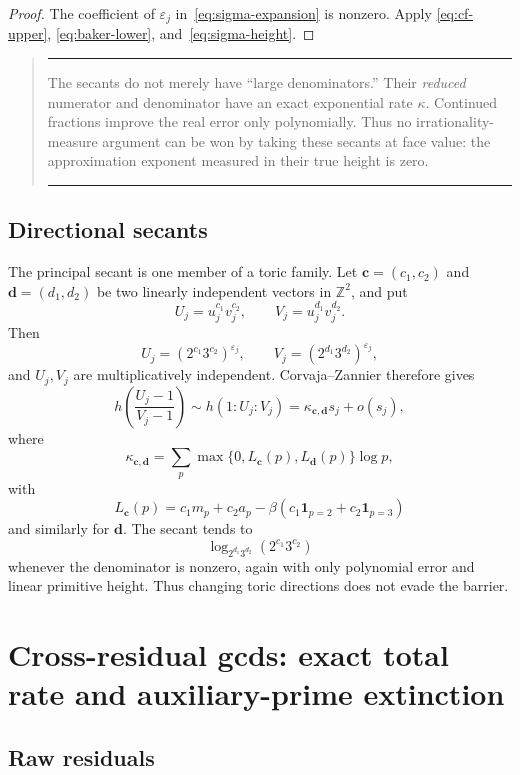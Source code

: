\documentclass[11pt,oneside]{article}
\theoremstyle{definition}
\theoremstyle{remark}
\newcommand{\Z}{\mathbb Z}
\newcommand{\eps}{\varepsilon}
\newenvironment{resultbox}
 {\begin{quote}\hrule\smallskip\noindent}
 {\par\smallskip\hrule\end{quote}}
\begin{document}
\begin{proof}
The coefficient of $\eps_j$ in~\eqref{eq:sigma-expansion} is nonzero.  Apply
\eqref{eq:cf-upper}, \eqref{eq:baker-lower}, and~\eqref{eq:sigma-height}.
\end{proof}

\begin{resultbox}
The secants do not merely have ``large denominators.''  Their \emph{reduced} numerator and
denominator have an exact exponential rate $\kappa$.  Continued fractions improve the real
error only polynomially.  Thus no irrationality-measure argument can be won by taking these
secants at face value: the approximation exponent measured in their true height is zero.
\end{resultbox}

\subsection{Directional secants}

The principal secant is one member of a toric family.  Let
$\mathbf c=(c_1,c_2)$ and $\mathbf d=(d_1,d_2)$ be two linearly independent vectors in
$\Z^2$, and put
\[
 U_j=u_j^{c_1}v_j^{c_2},\qquad
 V_j=u_j^{d_1}v_j^{d_2}.
\]
Then
\[
 U_j=(2^{c_1}3^{c_2})^{\eps_j},\qquad
 V_j=(2^{d_1}3^{d_2})^{\eps_j},
\]
and $U_j,V_j$ are multiplicatively independent.  Corvaja--Zannier therefore gives
\begin{equation}
 h\!\left(\frac{U_j-1}{V_j-1}\right)
 \sim h(1:U_j:V_j)=\kappa_{\mathbf c,\mathbf d}s_j+o(s_j),
 \label{eq:directional-height}
\end{equation}
where
\begin{equation}
 \kappa_{\mathbf c,\mathbf d}=
 \sum_p\max\{0,L_{\mathbf c}(p),L_{\mathbf d}(p)\}\log p,
 \label{eq:kappa-cd}
\end{equation}
with
\[
 L_{\mathbf c}(p)=c_1m_p+c_2a_p-
 \beta(c_1\mathbf1_{p=2}+c_2\mathbf1_{p=3})
\]
and similarly for $\mathbf d$.  The secant tends to
\[
 \log_{2^{d_1}3^{d_2}}(2^{c_1}3^{c_2})
\]
whenever the denominator is nonzero, again with only polynomial error and linear primitive
height.  Thus changing toric directions does not evade the barrier.

\section{Cross-residual gcds: exact total rate and auxiliary-prime extinction}
\label{sec:gcd}

\subsection{Raw residuals}
\end{document}
